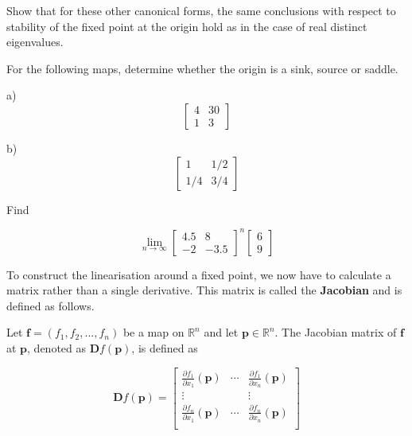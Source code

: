 \begin{exer}
Show that for these other canonical forms, the same conclusions with respect to stability of the fixed point at the origin hold as in the case of real distinct eigenvalues.
\end{exer}



\begin{exer}
For the following maps, determine whether the origin is a sink, source or saddle.

a) $$\begin{bmatrix}4 & 30 \\ 1 & 3 \end{bmatrix}$$

b) $$\begin{bmatrix}1 & 1/2 \\ 1/4 & 3/4 \end{bmatrix}$$

\end{exer}



\begin{exer}
Find

$$\lim_{n \to \infty}\begin{bmatrix}4.5 & 8 \\ -2 & -3.5 \end{bmatrix} ^ n \begin{bmatrix} 6 \\ 9 \end{bmatrix}$$

\end{exer}


\pagebreak


To construct the linearisation around a fixed point, we now have to calculate a matrix rather than a single derivative. This matrix is called the \textbf{Jacobian} and is defined as follows.

Let ${\mathbf f}=(f_1,f_2, ... ,f_n)$ be a map on $\mathbb{R}^n$ and let ${\mathbf p} \in \mathbb{R}^n$. The Jacobian matrix of ${\mathbf f}$ at ${\mathbf p}$, denoted as ${\mathbf Df}({\mathbf p})$, is defined as

\begin{equation}
{\mathbf Df}({\mathbf p})=
\begin{bmatrix}
\frac{\partial f_1}{\partial x_1}({\mathbf p}) & \cdots & \frac{\partial f_1}{\partial x_n}({\mathbf p}) \\
\vdots & & \vdots \\
\frac{\partial f_n}{\partial x_1}({\mathbf p}) & \cdots & \frac{\partial f_n}{\partial x_n}({\mathbf p}) \\
\end{bmatrix} 
\end{equation} 

